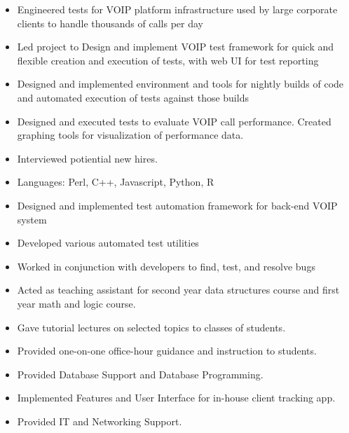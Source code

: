 \documentclass[11pt,a4paper,sans]{moderncv}
\begin{document}
{ \begin{itemize} \itemsep -1pt
  \item Engineered tests for VOIP platform infrastructure used by large corporate clients to handle thousands of calls per day\item Led project to Design and implement VOIP test framework for quick and flexible creation and execution of tests, with web UI for test reporting\item Designed and implemented environment and tools for nightly builds of code and automated execution of tests against those builds\item Designed and executed tests to evaluate VOIP call performance. Created graphing tools for visualization of performance data.\item Interviewed potiential new hires.\item Languages: Perl, C++, Javascript, Python, R
\end{itemize} }
  
{ \begin{itemize} \itemsep -1pt
  \item Designed and implemented test automation framework for back-end VOIP system\item Developed various automated test utilities\item Worked in conjunction with developers to find, test, and resolve bugs
\end{itemize} }
  
{ \begin{itemize} \itemsep -1pt
  \item Acted as teaching assistant for second year data structures course and first year math and logic course.\item Gave tutorial lectures on selected topics to classes of students.\item Provided one-on-one office-hour guidance and instruction to students.
\end{itemize} }
  
{ \begin{itemize} \itemsep -1pt
  \item Provided Database Support and Database Programming.\item Implemented Features and User Interface for in-house client tracking app.\item Provided IT and Networking Support.
\end{itemize} }
  
\end{document}

